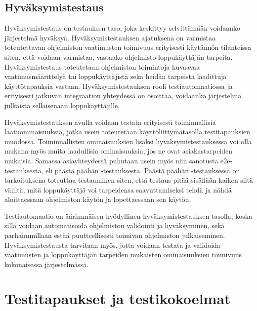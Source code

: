   \subsection{Hyväksymistestaus} \label{ch:07_hyvaksymistestaus}

    Hyväksymistestaus on testauksen taso, joka keskittyy selvittämään voidaanko järjestelmä hyväksyä.
    Hyväksymistestauksen ajatuksena on varmistaa toteutettavan ohjelmiston vaatimusten toimivuus erityisesti käytännön tilanteissa siten, että voidaan varmistaa, vastaako ohjelmisto loppukäyttäjän tarpeita.
    Hyväksymistestaus toteutetaan ohjelmiston toimintoja kuvaavaa vaatimusmäärittelyä tai loppukäyttäjistä sekä heidän tarpeista laadittuja käyttötapauksia vastaan.
    Hyväksymistestauksen rooli testiautomaatiossa ja erityisesti jatkuvan integraation yhteydessä on osoittaa, voidaanko järjestelmä julkaista sellaisenaan loppukäyttäjille. \cite{istqb_glossary_v3_3} \cite[s.~373]{software_testing_book}

    Hyväksymistestauksen avulla voidaan testata erityisesti toiminnallisia laatuominaisuuksia, jotka usein toteutetaan käyttöliittymätasolla testitapauksien muodossa.
    Toiminnallisten ominaisuuksien lisäksi hyväksymistestauksessa voi olla mukana myös muita laadullisia ominaisuuksia, jos ne ovat asiakastarpeiden mukaisia.
    Samassa asiayhteydessä puhutaan usein myös niin sanotusta e2e-testauksesta, eli päästä päähän -testauksesta.
    Päästä päähän -testauksessa on tarkoituksena toteuttaa testaaminen siten, että testaus pitää sisällään kaiken siltä väliltä, mitä loppukäyttäjä voi tarpeidensa saavuttamiseksi tehdä ja nähdä aloittaessaan ohjelmiston käytön ja lopettaessaan sen käytön.

    Testiautomaatio on äärimmäisen hyödyllinen hyväksymistestauksen tasolla, koska sillä voidaan automatisoida ohjelmiston validointi ja hyväksyminen, sekä parhaimmillaan estää puutteellisesti toimivan ohjelmiston julkaiseminen.
    Hyväksymistestausta tarvitaan myös, jotta voidaan testata ja validoida vaatimusten ja loppukäyttäjän tarpeiden mukaisten ominaisuuksien toimivuus kokonaisessa järjestelmässä.

\section{Testitapaukset ja testikokoelmat} \label{ch:07_testitapaukset_ja_testikokoelmat}

